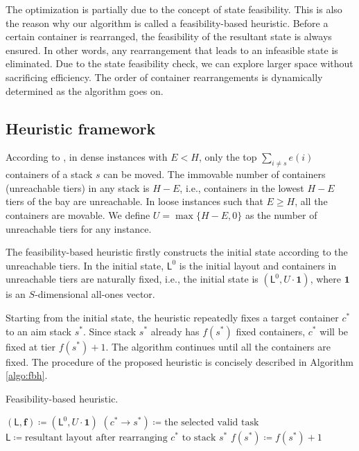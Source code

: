 \documentclass[review,3p,times,12pt,number]{elsarticle}\usepackage{amsmath}\usepackage{amssymb}
\renewcommand{\citet}[1]{\citeauthor{#1} \citep{#1}}
\renewcommand{\gets}{\coloneqq}
\newcommand{\setalgo}{\linespread{1}\fontsize{10}{12}\selectfont}
\begin{document}
The optimization is partially due to the concept of state feasibility.
This is also the reason why our algorithm is called a feasibility-based heuristic.
Before a certain container is rearranged, the feasibility of the resultant state is always ensured.
In other words, any rearrangement that leads to an infeasible state is eliminated.
Due to the state feasibility check, we can explore larger space without sacrificing efficiency. The order of container rearrangements is dynamically determined as the algorithm goes on.



\subsection{Heuristic framework}

According to \citet{wang2014}, in dense instances with $E<H$, only the top $\sum_{i\neq s}e(i)$ containers of a stack $s$ can be moved. The immovable number of containers (unreachable tiers) in any stack is $H-E$, i.e., containers in the lowest $H-E$ tiers of the bay are unreachable.
In loose instances such that $E\ge H$, all the containers are movable.
We define $U=\max\{H-E,0\}$ as the number of unreachable tiers for any instance.


The feasibility-based heuristic firstly constructs the initial state according to the unreachable tiers. In the initial state, $\mathsf{L}^0$ is the initial layout and containers in unreachable tiers are naturally fixed, i.e., the initial state is $(\mathsf{L}^0,U\cdot\boldsymbol{1})$, where $\boldsymbol 1$ is an $S$-dimensional all-ones vector.

Starting from the initial state, the heuristic repeatedly fixes a target container $c^*$ to an aim stack $s^*$.
Since stack $s^*$ already has $f(s^*)$ fixed containers, $c^*$ will be fixed at tier $f(s^*)+1$. The algorithm continues until all the containers are fixed. The procedure of the proposed heuristic is concisely described in Algorithm \ref{algo:fbh}.

\begin{algorithm}[htbp]
\caption{Feasibility-based heuristic.}
\label{algo:fbh}


\setalgo


\Begin
{
  $(\mathsf{L},\boldsymbol{f})\gets (\mathsf{L}^0,U\cdot\boldsymbol{1})$\;
  {
    $(c^*\rightarrow s^*)\gets\textrm{the selected valid task}$\;
    $\mathsf{L} \gets \textrm{resultant layout after rearranging $c^*$ to stack $s^*$}$\;
    $f(s^*)\gets f(s^*)+1$\;
  }
}

\end{algorithm}
\end{document}
